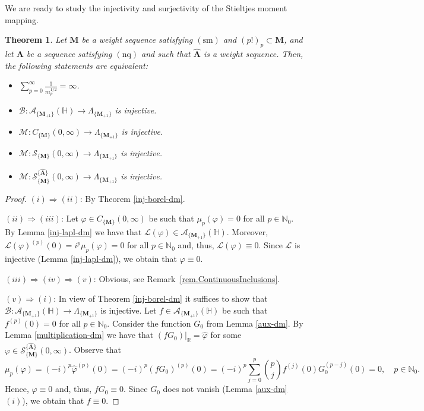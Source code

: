 \documentclass[12pt,a4paper]{article}
\newcommand{\N}{\mathbb{N}}
\newcommand{\R}{\mathbb{R}}
\newcommand{\HH}{\mathbb{H}}
\newcommand{\CM}{C_{\{\M\}}(0,\infty)}
\newcommand{\M}{{\boldsymbol{M}}}
\newcommand{\A}{{\boldsymbol{A}}}
\newcommand{\hA}{\widehat{{\boldsymbol{A}}}}
\newcommand{\nq}{\operatorname{(nq)}}
\newcommand{\sm}{\operatorname{(sm)}}
\theoremstyle{plain}
\newtheorem{theorem}{Theorem}[section]
\theoremstyle{definition}
\numberwithin{equation}{section}
\begin{document}
We are ready to study the injectivity and surjectivity of the Stieltjes moment mapping.

\begin{theorem}\label{inj-stiel-dm} Let $\M$ be a weight sequence satisfying $\sm$ and $(p!)_p\subset \M$, and let $\A$ be a sequence satisfying $\nq$ and such that $\hA$ is a weight sequence. Then, the following statements are equivalent:
\begin{itemize}
\item[$(i)$] $\displaystyle \sum_{p = 0}^\infty \frac{1}{m_p^{1/2}} = \infty$.
\item[$(ii)$] $\mathcal{B}: \mathcal{A}_{\{\M_{+1}\}}(\HH) \rightarrow \Lambda_{\{\M_{+1}\}}$ is injective.
\item[$(iii)$] $\mathcal{M}: \CM \rightarrow \Lambda_{\{\M_{+1}\}}$ is injective.
\item[$(iv)$] $\mathcal{M}: \mathcal{S}_{\{\M\}}(0,\infty) \rightarrow \Lambda_{\{\M_{+1}\}}$ is injective.
\item[$(v)$] $\mathcal{M}: \mathcal{S}^{\{\hA\}}_{\{\M\}}(0,\infty) \rightarrow \Lambda_{\{\M_{+1}\}}$ is injective.
\end{itemize}
\end{theorem}
\begin{proof}
$(i) \Rightarrow (ii)$: By Theorem \ref{inj-borel-dm}.

$(ii) \Rightarrow (iii)$: Let $\varphi \in \CM$ be such that $\mu_p(\varphi) = 0$ for all $p \in \N_0$. By Lemma \ref{inj-lapl-dm} we have that $\mathcal{L}(\varphi) \in \mathcal{A}_{\{\M_{+1}\}}(\HH)$.  Moreover,
$
\mathcal{L}(\varphi)^{(p)}(0) = i^p \mu_p(\varphi) = 0$ for all $p \in \N_0$ and, thus,
$\mathcal{L}(\varphi) \equiv 0$. Since $\mathcal{L}$ is injective (Lemma \ref{inj-lapl-dm}), we obtain that $\varphi \equiv 0$.

$(iii) \Rightarrow (iv) \Rightarrow (v)$: Obvious, see Remark~\ref{rem.ContinuousInclusions}.

$(v) \Rightarrow (i)$: In view of Theorem \ref{inj-borel-dm} it suffices to show that $\mathcal{B}: \mathcal{A}_{\{\M_{+1}\}}(\HH) \rightarrow \Lambda_{\{\M_{+1}\}}$ is injective. Let $f \in \mathcal{A}_{\{\M_{+1}\}}(\HH)$ be such that $f^{(p)}(0) = 0$ for all $p \in \N_0$. Consider the function $G_0$ from Lemma \ref{aux-dm}. By Lemma \ref{multiplication-dm} we have that $(fG_0)|_{\R} = \widehat{\varphi}$ for some $\varphi \in \mathcal{S}^{\{\hA\}}_{\{\M\}}(0,\infty)$. Observe that
$$
\mu_p(\varphi) = (-i)^p \widehat{\varphi}^{(p)}(0) = (-i)^p(fG_0)^{(p)}(0) = (-i)^p\sum_{j=0}^p \binom{p}{j} f^{(j)}(0) G_0^{(p-j)}(0) = 0, \quad p \in \N_0.
$$
Hence, $\varphi \equiv 0$ and, thus, $fG_0 \equiv 0$. Since $G_0$ does not vanish (Lemma \ref{aux-dm}$(i)$), we obtain that $f \equiv 0$.
\end{proof}
\end{document}
